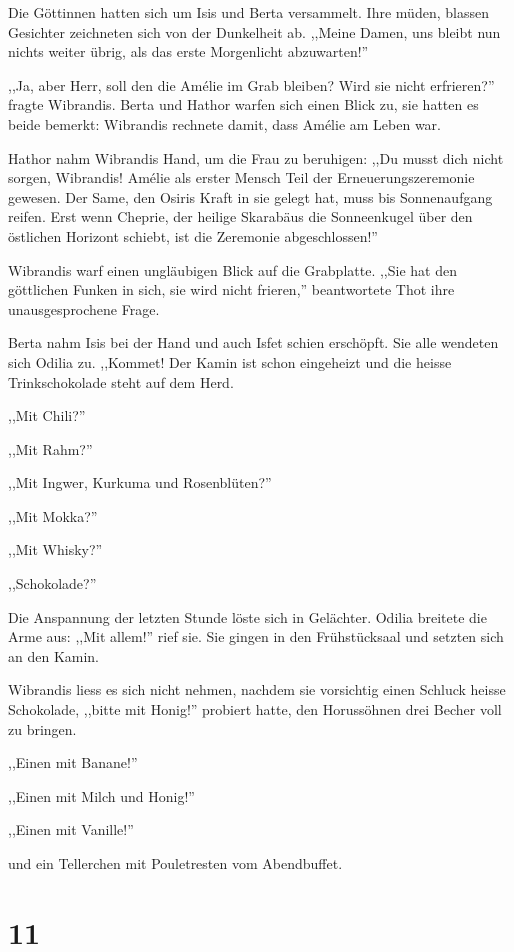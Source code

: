 \documentclass[11pt,titlepage,a5paper]{book}
\begin{document}
Die Göttinnen hatten sich um Isis und Berta versammelt. Ihre müden, blassen Gesichter zeichneten sich von der Dunkelheit ab. ,,Meine Damen, uns bleibt nun nichts weiter übrig, als das erste Morgenlicht abzuwarten!'' 

,,Ja, aber Herr, soll den die Amélie im Grab bleiben? Wird sie nicht erfrieren?'' fragte Wibrandis. Berta und Hathor warfen sich einen Blick zu, sie hatten es beide bemerkt: Wibrandis rechnete damit, dass Amélie am Leben war.

Hathor nahm Wibrandis Hand, um die Frau zu beruhigen: ,,Du musst dich nicht sorgen, Wibrandis! Amélie als erster Mensch Teil der Erneuerungszeremonie gewesen. Der Same, den Osiris Kraft in sie gelegt hat, muss bis Sonnenaufgang reifen. Erst wenn Cheprie, der heilige Skarabäus die Sonneenkugel über den östlichen Horizont schiebt, ist die Zeremonie abgeschlossen!''

Wibrandis warf einen ungläubigen Blick auf die Grabplatte. ,,Sie hat den göttlichen Funken in sich, sie wird nicht frieren,'' beantwortete Thot ihre unausgesprochene Frage.

Berta nahm Isis bei der Hand und auch Isfet schien erschöpft. Sie alle wendeten sich Odilia zu. ,,Kommet! Der Kamin ist schon eingeheizt und die heisse Trinkschokolade steht auf dem Herd.

,,Mit Chili?''

,,Mit Rahm?''

,,Mit Ingwer, Kurkuma und Rosenblüten?''

,,Mit Mokka?''

,,Mit Whisky?''

,,Schokolade?''

Die Anspannung der letzten Stunde löste sich in Gelächter. Odilia breitete die Arme aus: ,,Mit allem!'' rief sie. Sie gingen in den Frühstücksaal und setzten sich an den Kamin.

Wibrandis liess es sich nicht nehmen, nachdem sie vorsichtig einen Schluck heisse Schokolade, ,,bitte mit Honig!'' probiert hatte, den Horussöhnen drei Becher voll zu bringen.

,,Einen mit Banane!''

,,Einen mit Milch und Honig!''

,,Einen mit Vanille!''

und ein Tellerchen mit Pouletresten vom Abendbuffet.

\section*{11}
\end{document}
